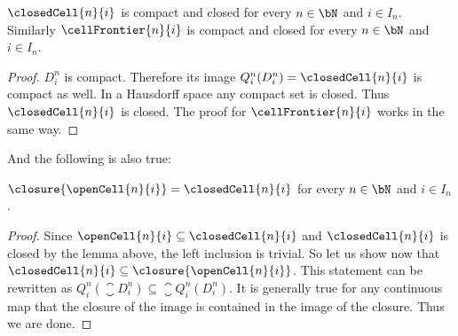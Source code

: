 \begin{lem}\label{lem:closedCellclosed}
    $\closedCell{n}{i}$ is compact 
    \href{https://github.com/scholzhannah/CWComplexes/blob/7be4872a05b534011cc969eb5b80a4b7f0bf57e2/CWcomplexes/Definition.lean#L151-L152}{\faExternalLink} 
    and closed 
    \href{https://github.com/scholzhannah/CWComplexes/blob/7be4872a05b534011cc969eb5b80a4b7f0bf57e2/CWcomplexes/Definition.lean#L154-L155}{\faExternalLink}
    for every $n \in \bN$ and $i \in I_n$.
    Similarly $\cellFrontier{n}{i}$ is compact 
    \href{https://github.com/scholzhannah/CWComplexes/blob/7be4872a05b534011cc969eb5b80a4b7f0bf57e2/CWcomplexes/Definition.lean#L157-L158}{\faExternalLink} 
    and closed 
    \href{https://github.com/scholzhannah/CWComplexes/blob/7be4872a05b534011cc969eb5b80a4b7f0bf57e2/CWcomplexes/Definition.lean#L160-L161}{\faExternalLink} 
    for every $n \in \bN$ and $i \in I_n$.
\end{lem}
\begin{proof}
    $D_i^n$ is compact.
    Therefore its image $Q_i^n(D_i^n) = \closedCell{n}{i}$ is compact as well.
    In a Hausdorff space any compact set is closed.
    \href{https://github.com/leanprover-community/mathlib4/blob/ed125a4216d18273cb1b96d4c846d32b85d74faf/Mathlib/Topology/Separation.lean#L1759-L1764}{\faExternalLink}
    Thus $\closedCell{n}{i}$ is closed.
    The proof for $\cellFrontier{n}{i}$ works in the same way.
\end{proof}

And the following is also true:

\begin{lem}\label{lem:closureopencell}
    $\closure{\openCell{n}{i}} = \closedCell{n}{i}$ for every $n \in \bN$ and $i \in I_n$.
    \href{https://github.com/scholzhannah/CWComplexes/blob/7be4872a05b534011cc969eb5b80a4b7f0bf57e2/CWcomplexes/Definition.lean#L163-L169}{\faExternalLink}
\end{lem}
\begin{proof}
    Since $\openCell{n}{i} \subseteq \closedCell{n}{i}$ and $\closedCell{n}{i}$ is closed by the lemma above, the left inclusion is trivial.
    So let us show now that $\closedCell{n}{i} \subseteq \closure{\openCell{n}{i}}$.
    This statement can be rewritten as $Q_i^n \left ( \closure{D_i^n} \right ) \subseteq \closure{Q_i^n(D_i^n)}$.
    It is generally true for any continuous map that the closure of the image is contained in the image of the closure.
    \href{https://github.com/leanprover-community/mathlib4/blob/ed125a4216d18273cb1b96d4c846d32b85d74faf/Mathlib/Topology/ContinuousOn.lean#L676-L678}{\faExternalLink}
    Thus we are done.
\end{proof}

